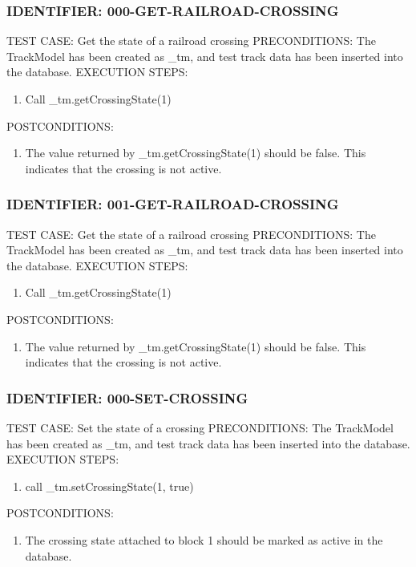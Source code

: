 \documentclass{scrreprt}
\begin{document}
\subsubsection{IDENTIFIER: 000-GET-RAILROAD-CROSSING}
TEST CASE: Get the state of a railroad crossing
PRECONDITIONS: The TrackModel has been created as _tm, and test track data has been inserted into the database.
EXECUTION STEPS:
\begin{enumerate}
	\item Call _tm.getCrossingState(1)
\end{enumerate}
POSTCONDITIONS:
\begin{enumerate}
	\item The value returned by _tm.getCrossingState(1) should be false. This indicates that the crossing is not active.
\end{enumerate}

\subsubsection{IDENTIFIER: 001-GET-RAILROAD-CROSSING}
TEST CASE: Get the state of a railroad crossing
PRECONDITIONS: The TrackModel has been created as _tm, and test track data has been inserted into the database.
EXECUTION STEPS:
\begin{enumerate}
	\item Call _tm.getCrossingState(1)
\end{enumerate}
POSTCONDITIONS:
\begin{enumerate}
	\item The value returned by _tm.getCrossingState(1) should be false. This indicates that the crossing is not active.
\end{enumerate}

\subsubsection{IDENTIFIER: 000-SET-CROSSING}
TEST CASE: Set the state of a crossing
PRECONDITIONS: The TrackModel has been created as _tm, and test track data has been inserted into the database.
EXECUTION STEPS:
\begin{enumerate}
	\item call _tm.setCrossingState(1, true)
\end{enumerate}
POSTCONDITIONS:
\begin{enumerate}
	\item The crossing state attached to block 1 should be marked as active in the database.
\end{enumerate}
\end{document}
